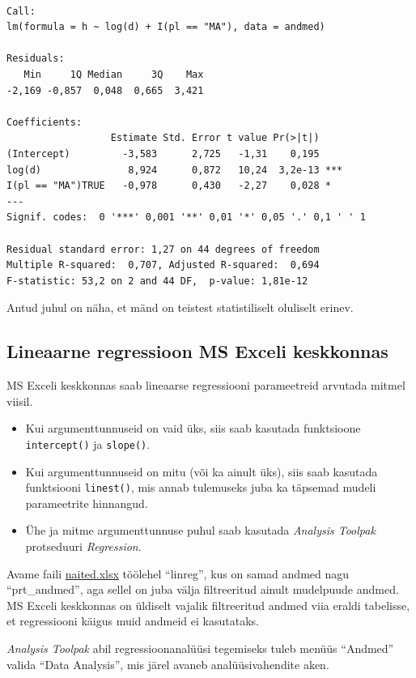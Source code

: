 \documentclass[
]{book}
\providecommand{\tightlist}{%
  \setlength{\itemsep}{0pt}\setlength{\parskip}{0pt}}
\begin{document}
\begin{verbatim}

Call:
lm(formula = h ~ log(d) + I(pl == "MA"), data = andmed)

Residuals:
   Min     1Q Median     3Q    Max 
-2,169 -0,857  0,048  0,665  3,421 

Coefficients:
                  Estimate Std. Error t value Pr(>|t|)    
(Intercept)         -3,583      2,725   -1,31    0,195    
log(d)               8,924      0,872   10,24  3,2e-13 ***
I(pl == "MA")TRUE   -0,978      0,430   -2,27    0,028 *  
---
Signif. codes:  0 '***' 0,001 '**' 0,01 '*' 0,05 '.' 0,1 ' ' 1

Residual standard error: 1,27 on 44 degrees of freedom
Multiple R-squared:  0,707, Adjusted R-squared:  0,694 
F-statistic: 53,2 on 2 and 44 DF,  p-value: 1,81e-12
\end{verbatim}

Antud juhul on näha, et mänd on teistest statistiliselt oluliselt erinev.

\subsection{Lineaarne regressioon MS Exceli keskkonnas}\label{lineaarne-regressioon-ms-exceli-keskkonnas}

MS Exceli keskkonnas saab lineaarse regressiooni parameetreid arvutada mitmel viisil.

\begin{itemize}
\tightlist
\item
  Kui argumenttunnuseid on vaid üks, siis saab kasutada funktsioone \texttt{intercept()} ja \texttt{slope()}.
\item
  Kui argumenttunnuseid on mitu (või ka ainult üks), siis saab kasutada funktsiooni \texttt{linest()}, mis annab tulemuseks juba ka täpsemad mudeli parameetrite hinnangud.
\item
  Ühe ja mitme argumenttunnuse puhul saab kasutada \emph{Analysis Toolpak} protseduuri \emph{Regression}.
\end{itemize}

Avame faili \href{data/naited.xlsx}{naited.xlsx} töölehel ``linreg'', kus on samad andmed nagu ``prt\_andmed'', aga sellel on juba välja filtreeritud ainult mudelpuude andmed. MS Exceli keskkonnas on üldiselt vajalik filtreeritud andmed viia eraldi tabelisse, et regressiooni käigus muid andmeid ei kasutataks.

\emph{Analysis Toolpak} abil regressioonanalüüsi tegemiseks tuleb menüüs ``Andmed'' valida ``Data Analysis'', mis järel avaneb analüüsivahendite aken.
\end{document}

